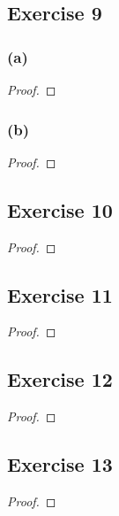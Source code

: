 \documentclass[14pt]{extarticle}
\begin{document}
\subsection{Exercise 9}

\subsubsection{(a)}

\begin{proof}

\end{proof}

\subsubsection{(b)}

\begin{proof}

\end{proof}

\subsection{Exercise 10}

\begin{proof}

\end{proof}

\subsection{Exercise 11}

\begin{proof}

\end{proof}

\subsection{Exercise 12}

\begin{proof}

\end{proof}

\subsection{Exercise 13}

\begin{proof}

\end{proof}
\end{document}

